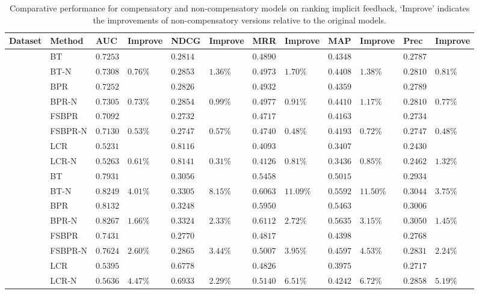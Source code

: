 \documentclass[letterpaper]{article} %
\begin{document}
\begin{table}[ht]
\tiny
\caption{Comparative performance for compensatory and non-compensatory models on ranking implicit feedback, `Improve' indicates the improvements of non-compensatory versions relative to the original models.}
\begin{center}
\begin{tabular}{p{0.4cm}<{\centering}|p{1.2cm}<{\centering} |p{0.5cm} p{0.6cm} |p{0.5cm} p{0.6cm} |p{0.5cm} p{0.6cm}|p{0.5cm} p{0.6cm} |p{0.5cm} p{0.6cm}}
\hline
Dataset	& Method	& AUC	& Improve&	NDCG&	Improve&	MRR	&Improve &	MAP&	Improve&	Prec	&Improve\\\hline
{} &	BT	& $0.7253 $&  &$0.2814$& &$0.4890$&   &$0.4348$& 	& $0.2787$ 	&\\
	&BT-N	&$0.7308$ &	$0.76\%$	&$0.2853 $	&$1.36\%$	&$0.4973$ &	$1.70\%$	&$0.4408$ &	$1.38\%$	&$0.2810 $	&$0.81\%$\\
	&BPR&	$0.7252$ 	&&	$0.2826$ 	&&	$0.4932$ & &$0.4359$& 	& $0.2789$ 	&\\
	&BPR-N	&$0.7305$ 	&$0.73\%$	&$0.2854$ &	$0.99\%$	&$0.4977$ 	&$0.91\%$ &$0.4410$ &	$1.17\%$	&$0.2810 $	&$0.77\%$	\\
	&FSBPR		&$0.7092$&	&$0.2732$ 	&&	$0.4717$& &$0.4163$& 	& $0.2734$ 	&\\	
	&FSBPR-N	&$0.7130$	&$0.53\%$	&	$0.2747$ 	&$0.57\%$	&$0.4740$ 	&$0.48\%$ &$0.4193$ &	$0.72\%$	&$0.2747 $	&$0.48\%$	\\
	&LCR		&$0.5231 $&	&$0.8116 $ 	&&	$0.4093 $& &$0.3407 $& 	& $0.2430 $ 	&\\	
	&LCR-N	&$0.5263 $	&$0.61\%$	&	$0.8141$ 	&$0.31\%$	&$0.4126$ 	&$0.81\%$ &$0.3436$ &	$0.85\%$	&$0.2462 $	&$1.32\%$\\

	\hline
{}	&	BT	& $0.7931 $&  &$0.3056$& &$0.5458$&   &$0.5015$& 	& $0.2934$ 	&\\
	&BT-N	&$0.8249$ &	$4.01\%$	&$0.3305 $	&$8.15\%$	&$0.6063$ &	$11.09\%$	&$0.5592$ &	$11.50\%$	&$0.3044 $	&$3.75\%$\\
	&BPR&	$0.8132$ 	&&	$0.3248$ 	&&	$0.5950$ & &$0.5463$& 	& $0.3006$ 	&\\
	&BPR-N	&$0.8267$ 	&$1.66\%$	&$0.3324$ &	$2.33\%$	&$0.6112$ 	&$2.72\%$ &$0.5635$ &	$3.15\%$	&$0.3050 $	&$1.45\%$	\\
	&FSBPR		&$0.7431$&	&$0.2770$ 	&&	$0.4817$& &$0.4398$& 	& $0.2768$ 	&\\	
	&FSBPR-N	&$0.7624$	&$2.60\%$	&	$0.2865$ 	&$3.44\%$	&$0.5007$ 	&$3.95\%$ &$0.4597$ &	$4.53\%$	&$0.2831 $	&$2.24\%$	\\
	&LCR		&$0.5395$&	&$0.6778$ 	&&	$0.4826$& &$0.3975$& 	& $0.2717$ 	&\\	
	&LCR-N	&$0.5636$	&$4.47\%$	&	$0.6933$ 	&$2.29\%$	&$0.5140$ 	&$6.51\%$ &$0.4242$ &	$6.72\%$	&$0.2858 $	&$5.19\%$\\


\end{tabular}
\end{center}
\end{table}
\end{document}
